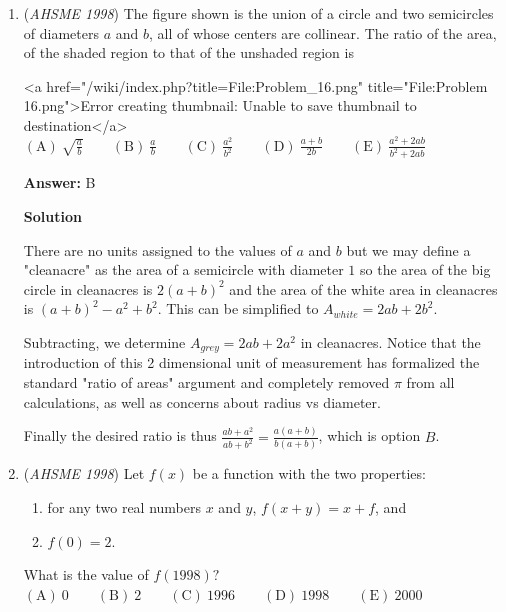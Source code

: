 \begin{enumerate}
 Setting the areas equal, we get:

 $s_t^2 = 6s_h^2$
$\left(\frac{s_t}{s_h}\right)^2 = 6$
$\frac{s_t}{s_h} = \sqrt{6}$, and the answer is $\boxed{C}$.

 


 


	\item (\textit{AHSME 1998}) The figure shown is the union of a circle and two semicircles of diameters $a$ and $b$, all of whose centers are collinear. The ratio of the area, of the shaded region to that of the unshaded region is


 <a href="/wiki/index.php?title=File:Problem\_16.png" title="File:Problem 16.png">Error creating thumbnail: Unable to save thumbnail to destination</a>$\mathrm{(A) \ } \sqrt{\frac ab} \qquad \mathrm{(B) \ }\frac ab \qquad \mathrm{(C) \ } \frac{a^2}{b^2} \qquad \mathrm{(D) \ }\frac{a+b}{2b} \qquad \mathrm{(E) \ } \frac{a^2 + 2ab}{b^2 + 2ab}$

 \textbf{Answer: }B



\textbf{Solution}

There are no units assigned to the values of $a$ and $b$ but we may define a "cleanacre" as the area of a semicircle with diameter $1$ so the area of the big circle in cleanacres is $2(a+b)^2$ and the area of the white area in cleanacres is $(a+b)^2 - a^2 + b^2$. This can be simplified to $A_{white} = 2ab + 2b^2$.

 Subtracting, we determine $A_{grey} = 2ab + 2a^2$ in cleanacres. Notice that the introduction of this 2 dimensional unit of measurement has formalized the standard "ratio of areas" argument and completely removed $\pi$ from all calculations, as well as concerns about radius vs diameter.

 Finally the desired ratio is thus $\frac{ab + a^2}{ab + b^2} = \frac{a(a+b)}{b(a+b)}$, which is option $\boxed{B}$.

 


	\item (\textit{AHSME 1998}) Let $f(x)$ be a function with the two properties:


 
            \begin{enumerate}[label=(\roman*)]
                \item  for any two real numbers $x$ and $y$, $f(x+y) = x + f$, and
\item  $f(0) = 2.$
            \end{enumerate}
            What is the value of $f(1998)?$
$\mathrm{(A)}\ 0  \qquad\mathrm{(B)}\ 2  \qquad\mathrm{(C)}\ 1996 \qquad\mathrm{(D)}\ 1998  \qquad\mathrm{(E)}\ 2000$


\end{enumerate}

